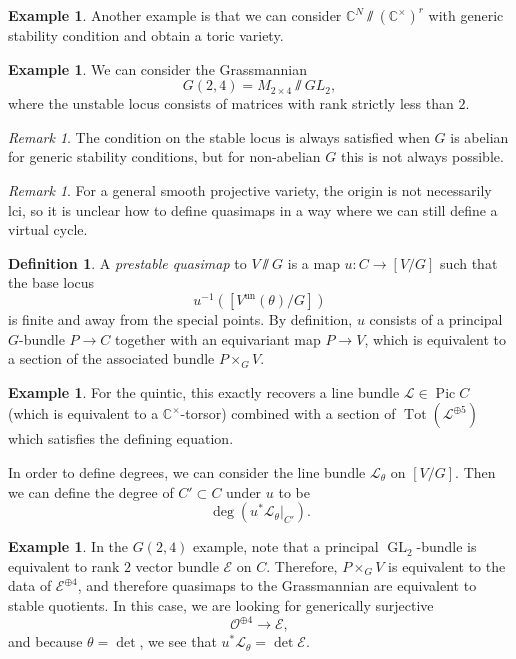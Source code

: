 \documentclass{amsart}
\theoremstyle{definition}
\newtheorem{defn}[thm]{Definition}
\newtheorem{exm}[thm]{Example}
\theoremstyle{remark}
\newtheorem{rmk}[thm]{Remark}
\theoremstyle{plain}
\theoremstyle{definition}
\theoremstyle{remark}
\newcommand{\C}{\mathbb{C}}
\newcommand{\mc}[1]{\mathcal{#1}}
\newcommand{\mr}[1]{\mathrm{#1}}
\newcommand{\on}[1]{\operatorname{#1}}
\newcommand{\1}{\mathbf{1}}
\newcommand{\2}{\mathbf{2}}
\newcommand{\3}{\mathbf{3}}
\DeclareMathOperator{\Pic}{Pic}
\begin{document}
\begin{exm}
    Another example is that we can consider \(\C^N \sslash (\C^{\times})^r\) with generic stability condition and obtain a toric variety.
\end{exm}

\begin{exm}
    We can consider the Grassmannian
    \[ G(2,4) = M_{2\times 4} \sslash GL_2, \]
    where the unstable locus consists of matrices with rank strictly less than \(2\).
\end{exm}

\begin{rmk}
    The condition on the stable locus is always satisfied when \(G\) is abelian for generic stability conditions, but for non-abelian \(G\) this is not always possible.
\end{rmk}

\begin{rmk}
    For a general smooth projective variety, the origin is not necessarily lci, so it is unclear how to define quasimaps in a way where we can still define a virtual cycle.
\end{rmk}

\begin{defn}
    A \textit{prestable quasimap} to \(V \sslash G\) is a map \(u \colon C \to [V/G]\) such that the base locus
    \[ u^{-1}([V^{\mr{un}}(\theta) / G]) \]
    is finite and away from the special points. By definition, \(u\) consists of a principal \(G\)-bundle \(P \to C\) together with an equivariant map \(P \to V\), which is equivalent to a section of the associated bundle \(P \times_G V\). 
\end{defn}

\begin{exm}
    For the quintic, this exactly recovers a line bundle \(\mc{L} \in \Pic C\) (which is equivalent to a \(\C^{\times}\)-torsor) combined with a section of \(\on{Tot}(\mc{L}^{\oplus 5})\) which satisfies the defining equation.
\end{exm}

In order to define degrees, we can consider the line bundle \(\mc{L}_{\theta}\) on \([V/G]\). Then we can define the degree of \(C' \subset C\) under \(u\) to be
\[ \deg (u^* \mc{L}_{\theta}|_{C'}). \]

\begin{exm}
    In the \(G(2,4)\) example, note that a principal \(\on{GL}_2\)-bundle is equivalent to rank \(2\) vector bundle \(\mc{E}\) on \(C\). Therefore, \(P \times_G V\) is equivalent to the data of \(\mc{E}^{\oplus 4}\), and therefore quasimaps to the Grassmannian are equivalent to stable quotients. In this case, we are looking for generically surjective
    \[ \mc{O}^{\oplus 4} \to \mc{E}, \]
    and because \(\theta = \det\), we see that \(u^* \mc{L}_{\theta} = \det \mc{E}\).
\end{exm}
\end{document}
